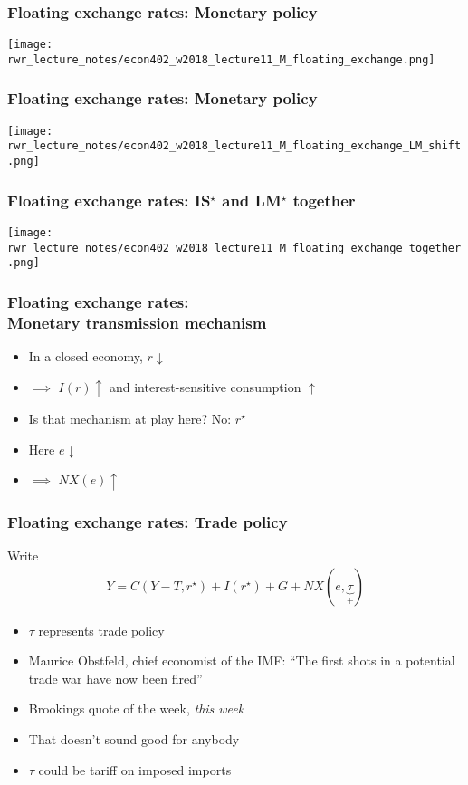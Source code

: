 \documentclass[presentation,dvipsnames]{beamer}
\begin{document}
\begin{frame}
\frametitle{Floating exchange rates: Monetary policy}
\centerline{\texttt{[image: rwr\_lecture\_notes/econ402\_w2018\_lecture11\_M\_floating\_exchange.png]}}
\end{frame}

\begin{frame}
\frametitle{Floating exchange rates: Monetary policy}
\centerline{\texttt{[image: rwr\_lecture\_notes/econ402\_w2018\_lecture11\_M\_floating\_exchange\_LM\_shift.png]}}
\end{frame}

\begin{frame}
\frametitle{Floating exchange rates: IS$^{\star}$ and LM$^{\star}$ together}
\centerline{\texttt{[image: rwr\_lecture\_notes/econ402\_w2018\_lecture11\_M\_floating\_exchange\_together.png]}}
\end{frame}

\begin{frame}
\frametitle{Floating exchange rates: \\ Monetary transmission mechanism}
\begin{itemize}[label={--}]
\item In a closed economy, $r \downarrow$ 
\item $\implies$ $I(r) \uparrow$ and interest-sensitive consumption $\uparrow$
\item Is that mechanism at play here? No: $r^{\star}$
\item Here $e \downarrow$
\item $\implies$ $NX(e) \uparrow$
\end{itemize}
\end{frame}

\begin{frame}
\frametitle{Floating exchange rates: Trade policy}
Write
\begin{align*}
Y = C(Y-T,r^{\star}) + I(r^{\star}) + G + NX(e,\underbrace{\tau}_{\text{+}})
\end{align*}
\begin{itemize}[label={--}]
\item $\tau$ represents trade policy
\item Maurice Obstfeld, chief economist of the IMF: ``The first shots in a potential trade war have now been fired''
\item Brookings quote of the week, \emph{this week}
\item That doesn't sound good for anybody
\item $\tau$ could be tariff on imposed imports
\end{itemize}
\end{frame}
\end{document}
